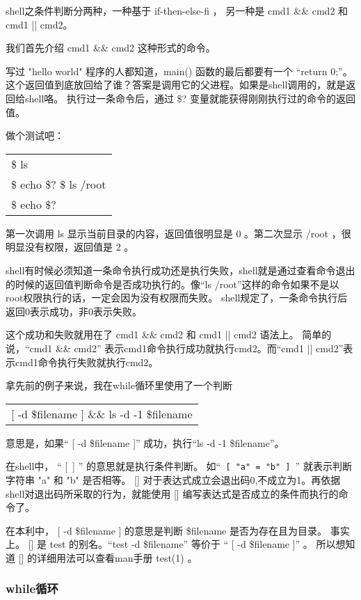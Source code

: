 \documentclass[amstex,twoside]{ctexbook}
\newenvironment{code}{\small\tt\begin{longtable}{p{0.8\textwidth}}}{\end{longtable}}
\begin{document}
shell之条件判断分两种，一种基于 if-then-else-fi ， 另一种是 cmd1 \&\& cmd2 和 cmd1 || cmd2。

我们首先介绍 cmd1 \&\& cmd2 这种形式的命令。

写过 "hello world" 程序的人都知道，main() 函数的最后都要有一个 “return 0;”。 这个返回值到底放回给了谁？答案是调用它的父进程。如果是shell调用的，就是返回给shell咯。
执行过一条命令后，通过 \$? 变量就能获得刚刚执行过的命令的返回值。

做个测试吧：

\begin{code}
\$ ls \\
\$ echo \$?
\$ ls /root \\
\$ echo \$? \\
\end{code}

第一次调用 ls 显示当前目录的内容，返回值很明显是 0 。第二次显示 /root ，很明显没有权限，返回值是 2 。

shell有时候必须知道一条命令执行成功还是执行失败，shell就是通过查看命令退出的时候的返回值判断命令是否成功执行的。像“ls /root”这样的命令如果不是以root权限执行的话，一定会因为没有权限而失败。 shell规定了，一条命令执行后返回0表示成功，非0表示失败。

这个成功和失败就用在了 cmd1 \&\& cmd2 和 cmd1 || cmd2 语法上。
简单的说，“cmd1 \&\& cmd2” 表示cmd1命令执行成功就执行cmd2。而“cmd1 || cmd2”表示cmd1命令执行失败就执行cmd2。

拿先前的例子来说，我在while循环里使用了一个判断 
\begin{code}
  [ -d \$filename ] \&\&  ls -d -1 \$filename
\end{code}

意思是，如果“ [ -d \$filename ]” 成功，执行“ls -d -1 \$filename”。

在shell中， “ [~] ” 的意思就是执行条件判断。
如“\texttt{ [ "a" = "b" ] }” 就表示判断字符串 "a" 和 "b" 是否相等。
 [] 对于表达式成立会退出码0,不成立为1。再依据shell对退出码所采取的行为，就能使用 [] 编写表达式是否成立的条件而执行的命令了。
 
在本利中， [ -d \$filename ] 的意思是判断 \$filename 是否为存在且为目录。
事实上。 [] 是 test 的别名。“test -d \$filename” 等价于 “ [ -d \$filename ]” 。 所以想知道 [] 的详细用法可以查看man手册 test(1) 。

\subsubsection{while循环}
\end{document}
